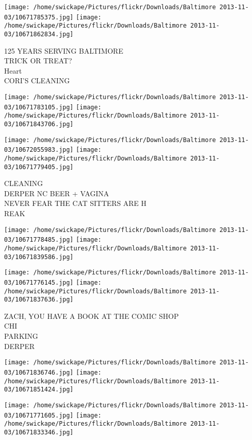 \documentclass[10pt,letterpaper]{article}
\begin{document}
\texttt{[image: /home/swickape/Pictures/flickr/Downloads/Baltimore 2013-11-03/10671785375.jpg]}
\texttt{[image: /home/swickape/Pictures/flickr/Downloads/Baltimore 2013-11-03/10671862834.jpg]}

125 YEARS SERVING BALTIMORE\\
TRICK OR TREAT?\\
Heart\\
CORI'S CLEANING\\
\pagebreak

\texttt{[image: /home/swickape/Pictures/flickr/Downloads/Baltimore 2013-11-03/10671783105.jpg]}
\texttt{[image: /home/swickape/Pictures/flickr/Downloads/Baltimore 2013-11-03/10671843706.jpg]}

\texttt{[image: /home/swickape/Pictures/flickr/Downloads/Baltimore 2013-11-03/10672055983.jpg]}
\texttt{[image: /home/swickape/Pictures/flickr/Downloads/Baltimore 2013-11-03/10671779405.jpg]}

CLEANING\\
DERPER NC BEER + VAGINA\\
NEVER FEAR THE CAT SITTERS ARE H\\
REAK\\
\pagebreak

\texttt{[image: /home/swickape/Pictures/flickr/Downloads/Baltimore 2013-11-03/10671778485.jpg]}
\texttt{[image: /home/swickape/Pictures/flickr/Downloads/Baltimore 2013-11-03/10671839586.jpg]}

\texttt{[image: /home/swickape/Pictures/flickr/Downloads/Baltimore 2013-11-03/10671776145.jpg]}
\texttt{[image: /home/swickape/Pictures/flickr/Downloads/Baltimore 2013-11-03/10671837636.jpg]}

ZACH, YOU HAVE A BOOK AT THE COMIC SHOP\\
CHI\\
PARKING\\
DERPER\\
\pagebreak

\texttt{[image: /home/swickape/Pictures/flickr/Downloads/Baltimore 2013-11-03/10671836746.jpg]}
\texttt{[image: /home/swickape/Pictures/flickr/Downloads/Baltimore 2013-11-03/10671851424.jpg]}

\texttt{[image: /home/swickape/Pictures/flickr/Downloads/Baltimore 2013-11-03/10671771605.jpg]}
\texttt{[image: /home/swickape/Pictures/flickr/Downloads/Baltimore 2013-11-03/10671833346.jpg]}
\end{document}
